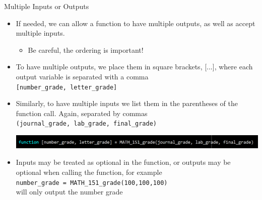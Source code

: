 {}\documentclass[letterpaper,
compress,
xcolor=x11names,
]{beamer}
\begin{document}

\begin{frame}{Multiple Inputs or Outputs}
	\footnotesize
	\begin{itemize}
		\item If needed, we can allow a function to have multiple outputs, as well as accept multiple inputs.
		\begin{itemize}
			\item Be careful, the ordering is important!
		\end{itemize}
		\item To have multiple outputs, we place them in square brackets, [...], where each output variable is separated with a comma \\
		\hspace{0.5cm}\texttt{[number\_grade, letter\_grade]}
		\item Similarly, to have multiple inputs we list them in the parentheses of the function call. Again, separated by commas\\
		\hspace{0.5cm}\texttt{(journal\_grade, lab\_grade, final\_grade)}
		\begin{center}
			\includegraphics[width = \linewidth]{multiple_IO.png}
		\end{center}
		\item Inputs may be treated as optional in the function, or outputs may be optional when calling the function, for example \\
		\hspace{0.5cm}\texttt{number\_grade = MATH\_151\_grade(100,100,100)} \\
		will only output the number grade
		
	\end{itemize}
\end{frame}

\end{document}
